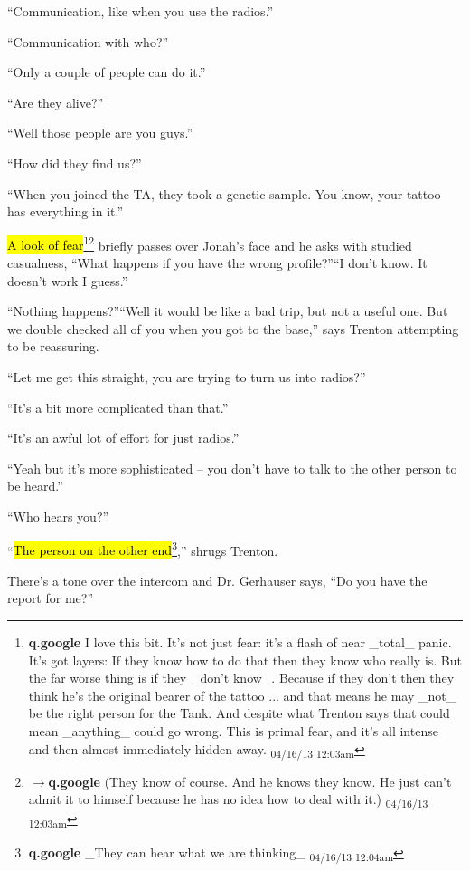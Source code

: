 ``Communication, like when you use the radios.''

``Communication with who?''

``Only a couple of people can do it.''

``Are they alive?''

``Well those people are you guys.''

``How did they find us?''

``When you joined the TA, they took a genetic sample.  You know, your tattoo has everything in it.''

\hl{A look of fear}\footnote{\textbf{q.google }I love this bit.  It's not just fear: it's a flash of near \_total\_ panic.  It's got layers: If they know how to do that then they know who really is.  But the far worse thing is if they \_don't know\_.  Because if they don't then they think he's the original bearer of the tattoo ... and that means he may \_not\_ be the right person for the Tank.  And despite what Trenton says that could mean \_anything\_ could go wrong.  This is primal fear, and it's all intense and then almost immediately hidden away. \textsubscript{04/16/13 12:03am}}\footnote{$\rightarrow$\textbf{q.google }(They know of course.  And he knows they know.  He just can't admit it to himself because he has no idea how to deal with it.) \textsubscript{04/16/13 12:03am}} briefly passes over Jonah's face and he asks with studied casualness, ``What happens if you have the wrong profile?''``I don't know.  It doesn't work I guess.''

``Nothing happens?''``Well it would be like a bad trip, but not a useful one.  But we double checked all of you when you got to the base,'' says Trenton attempting to be reassuring.

``Let me get this straight, you are trying to turn us into radios?''

``It's a bit more complicated than that.''

``It's an awful lot of effort for just radios.''

``Yeah but it's more sophisticated -- you don't have to talk to the other person to be heard.''

``Who hears you?''

``\hl{The person on the other end}\footnote{\textbf{q.google }\_They can hear what we are thinking\_ \textsubscript{04/16/13 12:04am}},'' shrugs Trenton.

There's a tone over the intercom and Dr. Gerhauser says, ``Do you have the report for me?''

